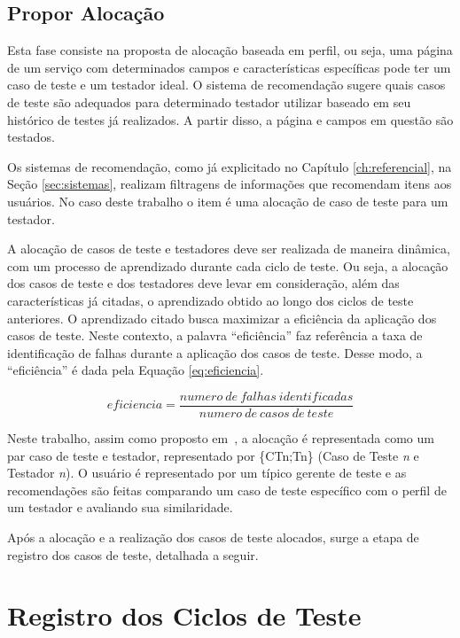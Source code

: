 \subsection{Propor Alocação}
 
 Esta fase consiste na proposta de alocação baseada em perfil, ou seja, uma página de um serviço com determinados campos e características específicas pode ter um caso de teste e um testador ideal. O sistema de recomendação sugere quais casos de teste são adequados para determinado testador utilizar baseado em seu histórico de testes já realizados. A partir disso, a página e campos em questão são testados.
 
 Os sistemas de recomendação, como já explicitado no Capítulo \ref{ch:referencial}, na Seção \ref{sec:sistemas}, realizam filtragens de informações que recomendam itens aos usuários. No caso deste trabalho o item é uma alocação de caso de teste para um testador. 
 
 A alocação de casos de teste e testadores deve ser realizada de maneira dinâmica, com um processo de aprendizado durante cada ciclo de teste. Ou seja, a alocação dos casos de teste e dos testadores deve levar em consideração, além das características já citadas, o aprendizado obtido ao longo dos ciclos de teste anteriores. O aprendizado citado busca maximizar a eficiência da aplicação dos casos de teste. Neste contexto, a palavra ``eficiência'' faz referência a taxa de identificação de falhas durante a aplicação dos casos de teste. Desse modo, a ``eficiência'' é dada pela Equação \ref{eq:eficiencia}.
 
 \begin{equation}
 \label{eq:eficiencia}
    eficiencia = \frac{numero \ de \ falhas\ identificadas}{numero\ de\ casos\ de\ teste}    
 \end{equation}
 
 
Neste trabalho, assim como proposto em~\cite{miranda2012recommender}, a alocação é representada como um par caso de teste e testador, representado por \{CTn;Tn\} (Caso de Teste \emph{n} e Testador \emph{n}). O usuário é representado por um típico gerente de teste e as recomendações são feitas comparando um caso de teste específico com o perfil de um testador e avaliando sua similaridade.
 
 Após a alocação e a realização dos casos de teste alocados, surge a etapa de registro dos casos de teste, detalhada a seguir.
 
\section{Registro dos Ciclos de Teste}

